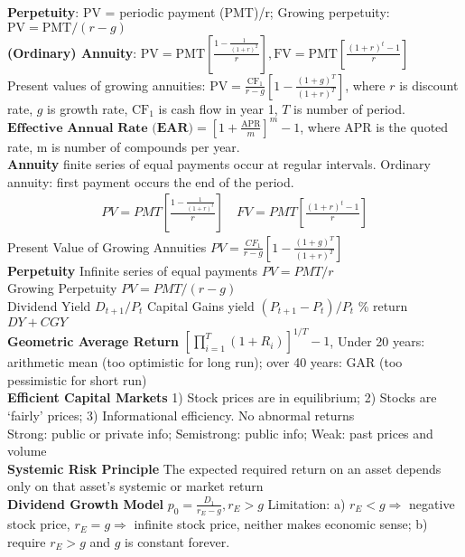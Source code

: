 \documentclass[12pt,landscape, a4paper]{article}
\theoremstyle{remark}
\begin{document}
\begin{multicols*}{3}
\textbf{Perpetuity}: PV = periodic payment (PMT)/r; Growing perpetuity: $\text{PV} = \text{PMT}/(r-g) $\\
\textbf{(Ordinary) Annuity}: $\text{PV} = \text{PMT} \left[\frac{1 - \frac{1}{(1+r)^2}}{r} \right], \text{FV} = \text{PMT} \left[\frac{(1+r)^t - 1}{r} \right]$
\\Present values of growing annuities: $\text{PV} = \frac{\text{CF}_1}{r-g} \left[1 - \frac{(1+g)^T}{(1+r)^T} \right]$, where $r$ is discount rate, $g$ is growth rate, $\text{CF}_1$ is cash flow in year 1, $T$ is number of period.\\
$\textbf{Effective Annual Rate (EAR)} = \left[1+ \frac{\text{APR}}{m} \right]^m - 1$, where APR is the quoted rate, m is number of compounds per year.\\

\textbf{Annuity} finite series of equal payments occur at regular intervals. Ordinary annuity: first payment occurs the end of the period. 
\begin{align*}
    PV = PMT \left[\frac{1 - \frac{1}{(1+r)^t}}{r} \right] \quad FV = PMT \left[\frac{(1+r)^t - 1}{r} \right]
\end{align*}
Present Value of Growing Annuities $PV = \frac{CF_1}{r-g} \left[1 - \frac{(1+g)^T}{(1+r)^T} \right]$\\
\textbf{Perpetuity} Infinite series of equal payments $PV = PMT / r$\\
Growing Perpetuity $PV = PMT / (r-g)$\\
Dividend Yield $D_{t+1} / P_t$ Capital Gains yield $(P_{t+1} - P_t) / P_t$ \% return $DY+CGY$\\

\textbf{Geometric Average Return} $\left[\prod^T_{i=1} (1+R_i ) \right]^{1/T} -1$,
Under 20 years: arithmetic mean (too optimistic for long run); over 40 years: GAR (too pessimistic for short run)\\

\textbf{Efficient Capital Markets} 1) Stock prices are in equilibrium; 2) Stocks are `fairly' prices; 3) Informational efficiency. No abnormal returns\\
Strong: public or private info; Semistrong: public info; Weak: past prices and volume\\

\textbf{Systemic Risk Principle} The expected required return on an asset depends only on that asset's systemic or market return\\

\textbf{Dividend Growth Model} $p_0 = \frac{D_1}{r_E - g}, r_E >g$ Limitation: a) $r_E < g \Rightarrow$ negative stock price, $r_E = g \Rightarrow$ infinite stock price, neither makes economic sense; b) require $r_E >g$ and $g$ is constant forever.\\


\end{multicols*}
\end{document}
